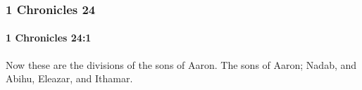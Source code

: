 	\subsubsection{1 Chronicles 24} %
		\label{1CHRONICLES-24}

		\paragraph{1 Chronicles 24:1} %
			\label{1CHRONICLES-24-1}

			Now these are the divisions of the sons of Aaron. The sons of Aaron; Nadab, and Abihu, Eleazar, and Ithamar.


